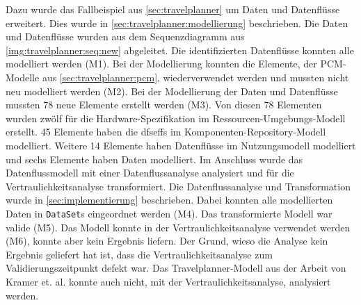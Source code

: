 Dazu wurde das Fallbeispiel aus \autoref{sec:travelplanner} um Daten und Datenflüsse erweitert. Dies wurde in \autoref{sec:travelplanner:modellierung} beschrieben. Die Daten und Datenflüsse wurden aus dem Sequenzdiagramm aus \autoref{img:travelplanner:seq:new} abgeleitet. Die identifizierten Datenflüsse konnten alle modelliert werden (M1). Bei der Modellierung konnten die Elemente, der PCM-Modelle aus \autoref{sec:travelplanner:pcm}, wiederverwendet werden und mussten nicht neu modelliert werden (M2). Bei der Modellierung der Daten und Datenflüsse mussten 78 neue Elemente erstellt werden (M3). Von diesen 78 Elementen wurden zwölf für die Hardware-Spezifikation im Ressourcen-Umgebungs-Modell erstellt. 45 Elemente haben die \gls{dfseff}s im Komponenten-Repository-Modell modelliert. Weitere 14 Elemente haben Datenflüsse im Nutzungsmodell modelliert und sechs Elemente haben Daten modelliert. Im Anschluss wurde das Datenflussmodell mit einer Datenflussanalyse analysiert und für die Vertraulichkeitsanalyse transformiert. Die Datenflussanalyse und Transformation wurde in \autoref{sec:implementierung} beschrieben. Dabei konnten alle modellierten Daten in \texttt{DataSet}s eingeordnet werden (M4). %
Das transformierte Modell war valide (M5). Das Modell konnte in der Vertraulichkeitsanalyse verwendet werden (M6), konnte aber kein Ergebnis liefern. Der Grund, wieso die Analyse kein Ergebnis geliefert hat ist, dass die Vertraulichkeitsanalyse zum Validierungszeitpunkt defekt war. Das Travelplanner-Modell aus der Arbeit von Kramer et. al. \cite{Kramera} konnte auch nicht, mit der Vertraulichkeitsanalyse, analysiert werden. \par 
